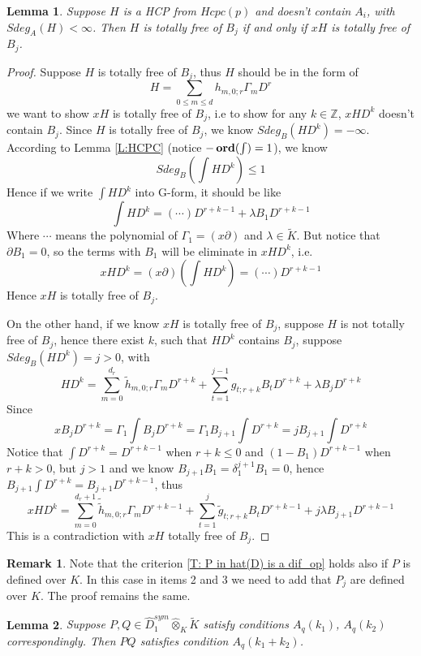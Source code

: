\documentclass[11pt]{article}
\theoremstyle{definition}
\newcommand{\Ord}{\mathop {\rm \bf ord}}
\newtheorem{rem}{Remark}[section]
\theoremstyle{plain}
\newtheorem{lemma}{Lemma}[section]
\numberwithin{equation}{section}
\begin{document}
\begin{lemma}
	\label{L:H tfree of Bj iff xH tfree of Bj}
	Suppose $H$ is a HCP from $Hcpc(p)$ and doesn't contain $A_i$, with $Sdeg_A(H)<\infty$. Then $H$ is totally free of $B_j$ if and only if $xH$ is totally free of $B_j$.
\end{lemma}

\begin{proof}
	Suppose $H$ is totally free of $B_j$, thus $H$ should be in the form of 
	$$
	H=\sum_{0\leq m\leq d} h_{m,0;r}\Gamma_m D^r
	$$
	we want to show $xH$ is totally free of $B_j$, i.e to show for any $k\in \mathbb{Z}$, $xHD^k$ doesn't contain $B_j$. Since $H$ is totally free of $B_j$, we know $Sdeg_B(HD^k)=-\infty$. According to Lemma \ref{L:HCPC} (notice $-\Ord(\int)=1$), we know 
	$$
	Sdeg_B(\int H D^k)\leq 1
	$$
	Hence if we write $\int H D^k$ into G-form, it should be like 
	$$
	\int HD^k=(\cdots)D^{r+k-1}+\lambda B_1D^{r+k-1}
	$$
	Where $\cdots$ means the polynomial of $\Gamma_1=(x\partial)$ and $\lambda\in \tilde{K}$. But notice that $\partial B_1=0$, so the terms with $B_1$ will be eliminate in $xHD^k$, i.e. 
	$$
	xH D^k=(x\partial)(\int HD^k)=(\cdots)D^{r+k-1}
	$$
	Hence $xH$ is totally free of $B_j$.
	
	On the other hand, if we know $xH$ is totally free of $B_j$, suppose $H$ is not totally free of $B_j$, hence there exist $k$, such that $HD^k$ contains $B_j$, suppose $Sdeg_B(HD^k)=j>0$, with
	$$
	HD^k=\sum_{m=0}^{d_r}\tilde{h}_{m,0;r}\Gamma_mD^{r+k}+\sum_{t=1}^{j-1}g_{t;r+k}B_tD^{r+k}+\lambda B_jD^{r+k}
	$$
	Since 
	$$
	xB_jD^{r+k}=\Gamma_1\int B_jD^{r+k}=\Gamma_1 B_{j+1}\int D^{r+k}=jB_{j+1}\int D^{r+k}
	$$
	Notice that $\int D^{r+k}=D^{r+k-1}$ when $r+k\leq 0$ and $(1-B_1)D^{r+k-1}$ when $r+k>0$, but $j>1$ and we know $B_{j+1}B_1=\delta_1^{j+1}B_1=0$, hence  $B_{j+1}\int D^{r+k}=B_{j+1}D^{r+k-1}$, thus
	$$
	xHD^k=\sum_{m=0}^{d_r+1}\tilde{\tilde{h}}_{m,0;r}\Gamma_mD^{r+k-1}+\sum_{t=1}^{j}\tilde{g}_{t;r+k}B_tD^{r+k-1}+j\lambda B_{j+1}D^{r+k-1}
	$$
	This is a contradiction with $xH$ totally free of $B_j$.
	\end{proof}

\begin{rem}
\label{R:criterion}
Note that the criterion \ref{T: P in hat(D) is a dif_op} holds also if $P$ is defined over $K$. In this case in items 2 and 3 we need to add that $P_j$ are defined over $K$. The proof remains the same.
\end{rem}


\begin{lemma}
\label{L:conditionA}
Suppose $P,Q\in \hat{D}_1^{sym}\hat{\otimes}_K\tilde{K}$ satisfy conditions $A_q(k_1)$, $A_q(k_2)$ correspondingly. Then 
$PQ$ satisfies condition $A_q(k_1+k_2)$.
\end{lemma}
\end{document}

